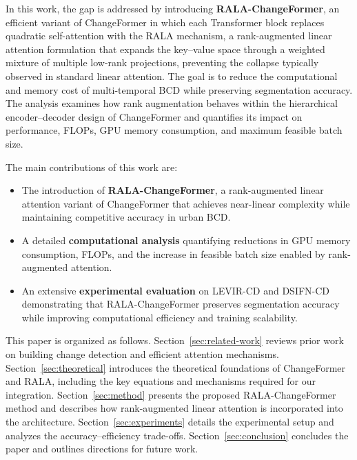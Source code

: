 In this work, the gap is addressed by introducing \textbf{RALA-ChangeFormer}, an efficient variant of ChangeFormer in which each Transformer block replaces quadratic self-attention with the RALA mechanism, a rank-augmented linear attention formulation that expands the key–value space through a weighted mixture of multiple low-rank projections, preventing the collapse typically observed in standard linear attention. The goal is to reduce the computational and memory cost of multi-temporal BCD while preserving segmentation accuracy. The analysis examines how rank augmentation behaves within the hierarchical encoder–decoder design of ChangeFormer and quantifies its impact on performance, FLOPs, GPU memory consumption, and maximum feasible batch size.

The main contributions of this work are:
\begin{itemize}
    \item The introduction of \textbf{RALA-ChangeFormer}, a rank-augmented linear attention variant of ChangeFormer that achieves near-linear complexity while maintaining competitive accuracy in urban BCD.
    \item A detailed \textbf{computational analysis} quantifying reductions in GPU memory consumption, FLOPs, and the increase in feasible batch size enabled by rank-augmented attention.
    \item An extensive \textbf{experimental evaluation} on LEVIR-CD and DSIFN-CD demonstrating that RALA-ChangeFormer preserves segmentation accuracy while improving computational efficiency and training scalability.
\end{itemize}

This paper is organized as follows. Section~\ref{sec:related-work} reviews prior work on building change detection and efficient attention mechanisms. Section~\ref{sec:theoretical} introduces the theoretical foundations of ChangeFormer and RALA, including the key equations and mechanisms required for our integration. Section~\ref{sec:method} presents the proposed RALA-ChangeFormer method and describes how rank-augmented linear attention is incorporated into the architecture. Section~\ref{sec:experiments} details the experimental setup and analyzes the accuracy–efficiency trade-offs. Section~\ref{sec:conclusion} concludes the paper and outlines directions for future work.
